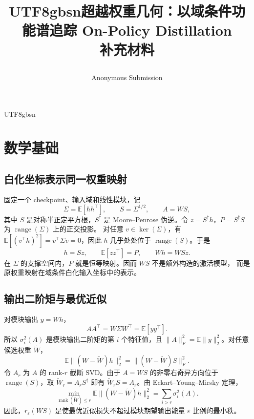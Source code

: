\documentclass[letterpaper]{article} %
\title{\begin{CJK*}{UTF8}{gbsn}超越权重几何：以域条件功能谱追踪 On-Policy Distillation\\补充材料\end{CJK*}}
\author{Anonymous Submission}
\begin{document}
\maketitle
\begin{CJK*}{UTF8}{gbsn}
\appendix

\section{数学基础}

\subsection{白化坐标表示同一权重映射}

固定一个 checkpoint、输入域和线性模块，记
\begin{equation}
\Sigma=\mathbb E[hh^\top],\qquad S=\Sigma^{1/2},\qquad A=WS,
\end{equation}
其中 $S$ 是对称半正定平方根，$S^\dagger$ 是 Moore--Penrose 伪逆。令
$z=S^\dagger h$，$P=S^\dagger S$ 为 $\operatorname{range}(\Sigma)$ 上的正交投影。
对任意 $v\in\ker(\Sigma)$，有
$\mathbb E[(v^\top h)^2]=v^\top\Sigma v=0$，因此 $h$ 几乎处处位于
$\operatorname{range}(S)$。于是
\begin{equation}
h=Sz,\qquad \mathbb E[zz^\top]=P,\qquad Wh=WSz.
\label{eq:supp-whiten}
\end{equation}
在 $\Sigma$ 的支撑空间内，$P$ 就是恒等映射。因而 $WS$ 不是额外构造的激活模型，
而是原权重映射在域条件白化输入坐标中的表示。

\subsection{输出二阶矩与最优近似}

对模块输出 $y=Wh$，
\begin{equation}
AA^\top=W\Sigma W^\top=\mathbb E[yy^\top].
\label{eq:supp-output}
\end{equation}
所以 $\sigma_i^2(A)$ 是模块输出二阶矩的第 $i$ 个特征值，且
$\|A\|_F^2=\mathbb E\|y\|_2^2$。对任意候选权重 $\widetilde W$，
\begin{equation}
\mathbb E\|(W-\widetilde W)h\|_2^2
=\|(W-\widetilde W)S\|_F^2.
\label{eq:supp-error}
\end{equation}
令 $A_r$ 为 $A$ 的 rank-$r$ 截断 SVD。由于 $A=WS$ 的非零右奇异方向位于
$\operatorname{range}(S)$，取 $\widetilde W_r=A_rS^\dagger$ 即有
$\widetilde W_rS=A_r$。由 Eckart--Young--Mirsky 定理，
\begin{equation}
\min_{\operatorname{rank}(\widetilde W)\le r}
\mathbb E\|(W-\widetilde W)h\|_2^2
=\sum_{i>r}\sigma_i^2(A).
\label{eq:supp-optimal}
\end{equation}
因此，$r_\varepsilon(WS)$ 是使最优近似损失不超过模块期望输出能量
$\varepsilon$ 比例的最小秩。


\end{CJK*}
\end{document}
